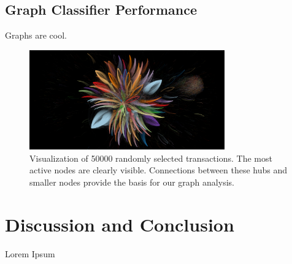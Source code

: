 \documentclass{article} %
\begin{document}

\subsection{Graph Classifier Performance}


Graphs are cool.

\begin{figure}
\centering
  \includegraphics[trim={9cm 0 3cm 0},clip, width=0.75\textwidth]{50000visualization.png}
\caption{Visualization of 50000 randomly selected transactions. The most active nodes are clearly visible. Connections between these hubs and smaller nodes provide the basis for our graph analysis.}
  \label{fig:vis}
\end{figure}


\section{Discussion and Conclusion}


Lorem Ipsum






\end{document}
